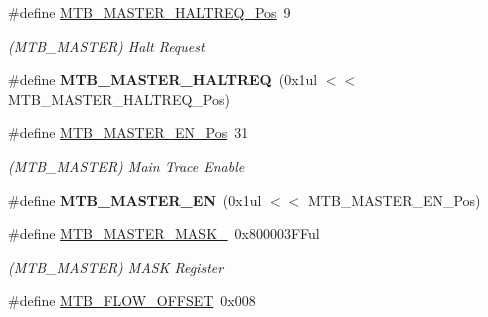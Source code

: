\begin{DoxyCompactItemize}
\item 
\hypertarget{group___s_a_m_l21___m_t_b_ga8a330adc9c36475c68783bf9bc740278}{}\#define \hyperlink{group___s_a_m_l21___m_t_b_ga8a330adc9c36475c68783bf9bc740278}{M\+T\+B\+\_\+\+M\+A\+S\+T\+E\+R\+\_\+\+H\+A\+L\+T\+R\+E\+Q\+\_\+\+Pos}~9\label{group___s_a_m_l21___m_t_b_ga8a330adc9c36475c68783bf9bc740278}

\begin{DoxyCompactList}\small\item\em (M\+T\+B\+\_\+\+M\+A\+S\+T\+E\+R) Halt Request \end{DoxyCompactList}\item 
\hypertarget{group___s_a_m_l21___m_t_b_gabbf8f04a1362e3988c6a5bf7638a5b7f}{}\#define {\bfseries M\+T\+B\+\_\+\+M\+A\+S\+T\+E\+R\+\_\+\+H\+A\+L\+T\+R\+E\+Q}~(0x1ul $<$$<$ M\+T\+B\+\_\+\+M\+A\+S\+T\+E\+R\+\_\+\+H\+A\+L\+T\+R\+E\+Q\+\_\+\+Pos)\label{group___s_a_m_l21___m_t_b_gabbf8f04a1362e3988c6a5bf7638a5b7f}

\item 
\hypertarget{group___s_a_m_l21___m_t_b_ga5c8356e28b7c4274d86b6342a4022a2d}{}\#define \hyperlink{group___s_a_m_l21___m_t_b_ga5c8356e28b7c4274d86b6342a4022a2d}{M\+T\+B\+\_\+\+M\+A\+S\+T\+E\+R\+\_\+\+E\+N\+\_\+\+Pos}~31\label{group___s_a_m_l21___m_t_b_ga5c8356e28b7c4274d86b6342a4022a2d}

\begin{DoxyCompactList}\small\item\em (M\+T\+B\+\_\+\+M\+A\+S\+T\+E\+R) Main Trace Enable \end{DoxyCompactList}\item 
\hypertarget{group___s_a_m_l21___m_t_b_ga3df3a47e8efa848f87d4805b4d6f497c}{}\#define {\bfseries M\+T\+B\+\_\+\+M\+A\+S\+T\+E\+R\+\_\+\+E\+N}~(0x1ul $<$$<$ M\+T\+B\+\_\+\+M\+A\+S\+T\+E\+R\+\_\+\+E\+N\+\_\+\+Pos)\label{group___s_a_m_l21___m_t_b_ga3df3a47e8efa848f87d4805b4d6f497c}

\item 
\hypertarget{group___s_a_m_l21___m_t_b_gab7418dbbb685e7ec4206ffaf98668c72}{}\#define \hyperlink{group___s_a_m_l21___m_t_b_gab7418dbbb685e7ec4206ffaf98668c72}{M\+T\+B\+\_\+\+M\+A\+S\+T\+E\+R\+\_\+\+M\+A\+S\+K\+\_\+}~0x800003\+F\+Ful\label{group___s_a_m_l21___m_t_b_gab7418dbbb685e7ec4206ffaf98668c72}

\begin{DoxyCompactList}\small\item\em (M\+T\+B\+\_\+\+M\+A\+S\+T\+E\+R) M\+A\+S\+K Register \end{DoxyCompactList}\item 
\hypertarget{group___s_a_m_l21___m_t_b_ga9d744a4798477f7c3262eee5c896acf5}{}\#define \hyperlink{group___s_a_m_l21___m_t_b_ga9d744a4798477f7c3262eee5c896acf5}{M\+T\+B\+\_\+\+F\+L\+O\+W\+\_\+\+O\+F\+F\+S\+E\+T}~0x008\label{group___s_a_m_l21___m_t_b_ga9d744a4798477f7c3262eee5c896acf5}


\end{DoxyCompactItemize}
